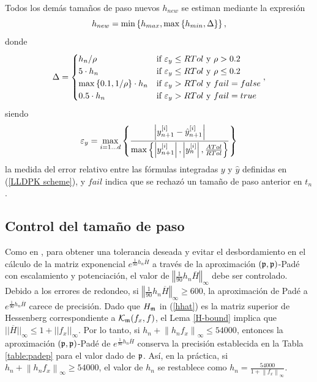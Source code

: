 Todos los demás tamaños de paso nuevos $h_{new}$ se estiman mediante la expresión
\begin{equation}
    h_{new} = \min\left\{ h_{max},\max\left\{ h_{min},\Delta \right\} \right\}, \label{hnewcalc}
\end{equation}
donde
\begin{equation*}
    \Delta = \begin{cases}
        h_n/\rho & \text{if } \varepsilon_y\leq RTol \text{ y } \rho>0\mathord{.}2\\
        5\cdot h_n & \text{if } \varepsilon_y\leq RTol \text{ y } \rho\leq 0\mathord{.}2\\
        \max\left\{ 0\mathord{.}1,1/\rho \right\}\cdot h_n & \text{if } \varepsilon_y > RTol \text{ y } fail=false\\
        0\mathord{.}5\cdot h_n & \text{if } \varepsilon_y > RTol \text{ y } fail=true
        \end{cases},
\end{equation*}
siendo
\begin{equation}\label{epsilon_y}
	\varepsilon_y =  \max_{i=1\ldots d}\left\{ \frac{\left\lvert y^{[i]}_{n+1}-\hat{y}^{[i]}_{n+1} \right\rvert}
	{\max\left\{ \left\lvert y^{[i]}_{n+1}  \right\rvert,\left\lvert y^{[i]}_{n}\right\rvert,\frac{ATol}{RTol} \right\}} \right\}
\end{equation}
la medida del error relativo entre las fórmulas integradas $y$ y $\hat{y}$ definidas en (\ref{LLDPK scheme}), y $fail$ indica que se rechazó un tamaño de paso anterior en $t_n$.

\subsection{Control del tamaño de paso}\label{secc:hcontrol}
Como en \cite{Jimenez14AMC}, para obtener una tolerancia deseada y evitar el desbordamiento en el cálculo de la matriz exponencial $e^{\frac{1}{90}h_n\overline{H}}$ a través de la aproximación $(\mathfrak{p},\mathfrak{p})$-Pad\'{e} con escalamiento y potenciación, el valor de $\left\Vert \frac{1}{90}h_n\overline{H} \right\Vert_\infty$ debe ser controlado. Debido a los errores de redondeo, si $\left\Vert \frac{1}{90}h_n\overline{H} \right\Vert_\infty \ge 600$, la aproximación de Padé a $e^{\frac{1 }{90}h_n\overline{H}}$ carece de precisión. Dado que $H_{\mathfrak{m}}$ in (\ref{hhat}) es la matriz superior de Hessenberg correspondiente a $\mathcal{K}_{\mathfrak{m}}(f_x,f)$, el Lema \ref{H-bound} implica que $|| \overline{H} ||_\infty \leq 1 + || f_x ||_\infty$. Por lo tanto, si $h_n + \left\lVert h_nf_x \right\rVert_\infty \leq 54000$, entonces la aproximación $(\mathfrak{p},\mathfrak{p})$-Padé de $e^{\frac{1}{90}h_n \overline{H}}$ conserva la precisión establecida en la Tabla \ref{table:padep} para el valor dado de $\mathfrak{p}$. Así, en la práctica, si $h_n + \left\lVert h_nf_x \right\rVert_\infty \ge 54000$, el valor de $h_n$ se restablece como $h_n=\frac{54000}{1+\left\lVert f_x \right\rVert_\infty}$.

